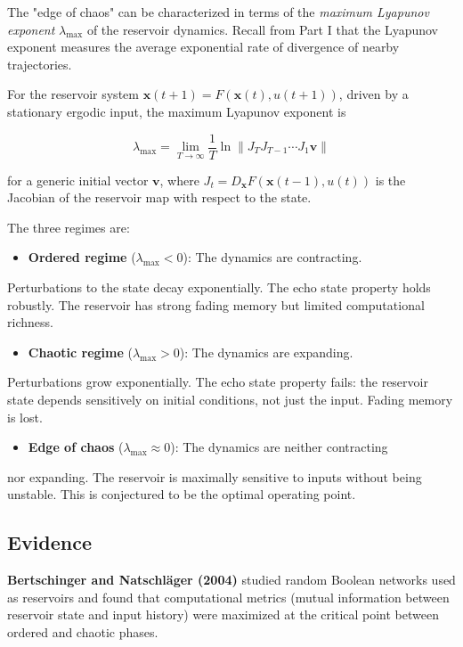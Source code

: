The "edge of chaos" can be characterized in terms of the \textit{maximum Lyapunov exponent}
$\lambda_{\max}$ of the reservoir dynamics. Recall from Part I that the Lyapunov
exponent measures the average exponential rate of divergence of nearby trajectories.

For the reservoir system $\mathbf{x}(t+1) = F(\mathbf{x}(t), u(t+1))$, driven by a
stationary ergodic input, the maximum Lyapunov exponent is

\[
\lambda_{\max} = \lim_{T \to \infty} \frac{1}{T} \ln \|J_T J_{T-1} \cdots J_1 \mathbf{v}\|
\]

for a generic initial vector $\mathbf{v}$, where $J_t = D_{\mathbf{x}} F(\mathbf{x}(t-1), u(t))$
is the Jacobian of the reservoir map with respect to the state.

The three regimes are:

\begin{itemize}[nosep]
  \item \textbf{Ordered regime} ($\lambda_{\max} < 0$): The dynamics are contracting.
\end{itemize}
  Perturbations to the state decay exponentially. The echo state property holds
  robustly. The reservoir has strong fading memory but limited computational richness.

\begin{itemize}[nosep]
  \item \textbf{Chaotic regime} ($\lambda_{\max} > 0$): The dynamics are expanding.
\end{itemize}
  Perturbations grow exponentially. The echo state property fails: the reservoir
  state depends sensitively on initial conditions, not just the input. Fading
  memory is lost.

\begin{itemize}[nosep]
  \item \textbf{Edge of chaos} ($\lambda_{\max} \approx 0$): The dynamics are neither contracting
\end{itemize}
  nor expanding. The reservoir is maximally sensitive to inputs without being unstable.
  This is conjectured to be the optimal operating point.

\subsection{Evidence}\label{sec:15.7.3}

\textbf{Bertschinger and Natschl\"ager (2004)} studied random Boolean networks used as
reservoirs and found that computational metrics (mutual information between reservoir
state and input history) were maximized at the critical point between ordered and
chaotic phases.

